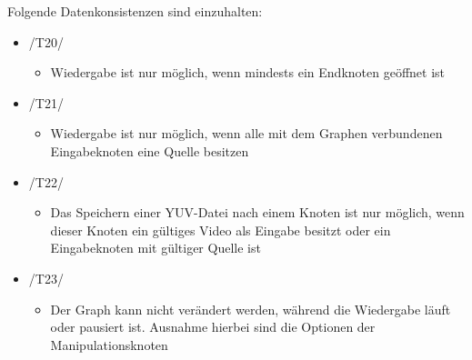 \newpage
Folgende Datenkonsistenzen sind einzuhalten:
\begin{itemize}
	\item /T20/
		\begin{itemize}
			\item Wiedergabe ist nur möglich, wenn mindests ein Endknoten geöffnet ist
		\end{itemize}
	\item /T21/
		\begin{itemize}
			\item Wiedergabe ist nur möglich, wenn alle mit dem Graphen verbundenen Eingabeknoten eine Quelle besitzen
		\end{itemize}
	\item /T22/
		\begin{itemize}
			\item Das Speichern einer YUV-Datei nach einem Knoten ist nur möglich, wenn dieser Knoten ein gültiges Video als Eingabe besitzt oder ein Eingabeknoten mit 
			gültiger Quelle ist
		\end{itemize}
	\item /T23/
		\begin{itemize}
			\item Der Graph kann nicht verändert werden, während die Wiedergabe läuft oder pausiert ist. Ausnahme hierbei sind die Optionen der Manipulationsknoten
		\end{itemize}
	\end{itemize}
